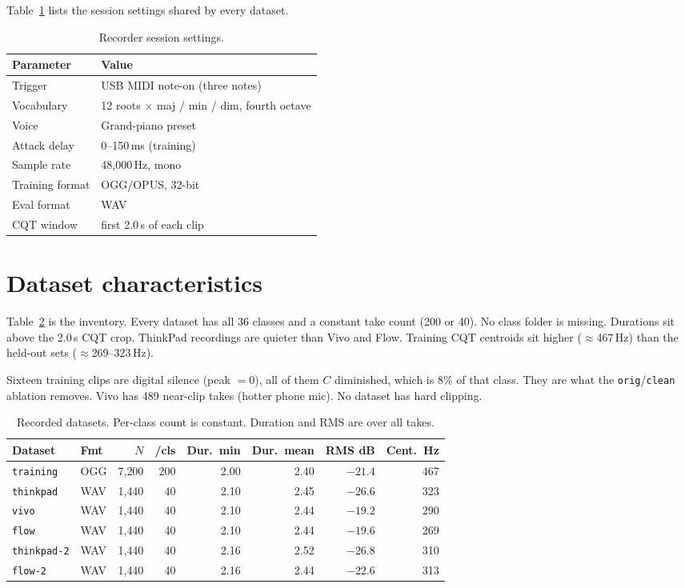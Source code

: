 \documentclass[pdflatex,sn-mathphys-num]{sn-jnl}
\begin{document}
Table~\ref{tab:esm-session} lists the session settings shared by every dataset.

\begin{table}[t]
\caption{Recorder session settings.}\label{tab:esm-session}
\begin{tabular}{@{}ll@{}}
\toprule
Parameter & Value \\
\midrule
Trigger & USB MIDI note-on (three notes) \\
Vocabulary & 12 roots $\times$ maj / min / dim, fourth octave \\
Voice & Grand-piano preset \\
Attack delay & 0--150\,ms (training) \\
Sample rate & 48{,}000\,Hz, mono \\
Training format & OGG/OPUS, 32-bit \\
Eval format & WAV \\
CQT window & first 2.0\,s of each clip \\
\bottomrule
\end{tabular}
\end{table}

\section{Dataset characteristics}\label{sec:datasets}

Table~\ref{tab:esm-inventory} is the inventory. Every dataset has all 36 classes and a constant take count (200 or 40). No class folder is missing. Durations sit above the 2.0\,s CQT crop. ThinkPad recordings are quieter than Vivo and Flow. Training CQT centroids sit higher ($\approx$467\,Hz) than the held-out sets ($\approx$269--323\,Hz).

Sixteen training clips are digital silence (peak $=0$), all of them $C$ diminished, which is 8\% of that class. They are what the \texttt{orig}/\texttt{clean} ablation removes. Vivo has 489 near-clip takes (hotter phone mic). No dataset has hard clipping.

\begin{table}[t]
\caption{Recorded datasets. Per-class count is constant. Duration and RMS are over all takes.}\label{tab:esm-inventory}
\setlength{\tabcolsep}{3.2pt}
\begin{tabular}{@{}llrrrrrr@{}}
\toprule
Dataset & Fmt & $N$ & /cls & Dur.\ min & Dur.\ mean & RMS dB & Cent.\ Hz \\
\midrule
\texttt{training} & OGG & 7{,}200 & 200 & 2.00 & 2.40 & $-21.4$ & 467 \\
\texttt{thinkpad} & WAV & 1{,}440 & 40 & 2.10 & 2.45 & $-26.6$ & 323 \\
\texttt{vivo} & WAV & 1{,}440 & 40 & 2.10 & 2.44 & $-19.2$ & 290 \\
\texttt{flow} & WAV & 1{,}440 & 40 & 2.10 & 2.44 & $-19.6$ & 269 \\
\texttt{thinkpad-2} & WAV & 1{,}440 & 40 & 2.16 & 2.52 & $-26.8$ & 310 \\
\texttt{flow-2} & WAV & 1{,}440 & 40 & 2.16 & 2.44 & $-22.6$ & 313 \\
\bottomrule
\end{tabular}
\end{table}
\end{document}

